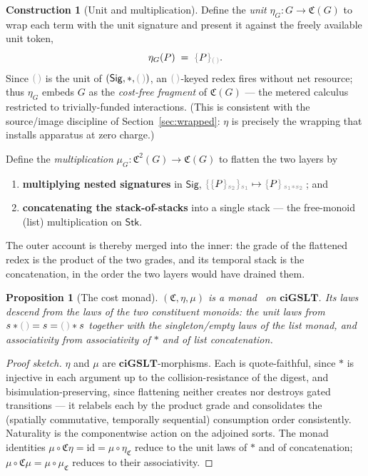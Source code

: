 \documentclass[11pt]{article}
\theoremstyle{definition}
\newtheorem{construction}[definition]{Construction}
\theoremstyle{plain}
\newtheorem{proposition}[definition]{Proposition}
\newcommand{\ciGSLT}{\mathbf{ciGSLT}}
\newcommand{\id}{\mathrm{id}}
\newcommand{\dec}[1]{\textcolor{costgray}{#1}}   %
\newcommand{\Sig}{\mathsf{Sig}}
\newcommand{\Tok}{\mathsf{Stk}}
\newcommand{\Cost}{\mathfrak{C}}              %
\newcommand{\sgn}[2]{\dec{\{}{#1}\dec{\}_{#2}}}  %
\newcommand{\nil}{\dec{(\,)}}                  %
\begin{document}
\begin{construction}[Unit and multiplication]
\label{con:monad}
Define the \emph{unit} $\eta_G : G \to \Cost(G)$ to wrap each term with
the unit signature and present it against the freely available unit
token,
\[
  \eta_G(P) \;=\; \sgn{P}{\nil}.
\]
Since $\nil$ is the unit of $(\Sig,*,\nil)$, an $\nil$-keyed redex fires
without net resource; thus $\eta_G$ embeds $G$ as the \emph{cost-free
fragment} of $\Cost(G)$ --- the metered calculus restricted to
trivially-funded interactions. (This is consistent with the source/image
discipline of Section~\ref{sec:wrapped}: $\eta$ is precisely the wrapping
that installs apparatus at zero charge.)

Define the \emph{multiplication} $\mu_G : \Cost^2(G) \to \Cost(G)$ to
flatten the two layers by
\begin{enumerate}[label=(\roman*),itemsep=1pt]
  \item \textbf{multiplying nested signatures} in $\Sig$,
    $\sgn{\sgn{P}{s_2}}{s_1} \mapsto \sgn{P}{\,s_1 * s_2\,}$; and
  \item \textbf{concatenating the stack-of-stacks} into a single stack ---
    the free-monoid (list) multiplication on $\Tok$.
\end{enumerate}
The outer account is thereby merged into the inner: the grade of the
flattened redex is the product of the two grades, and its temporal stack
is the concatenation, in the order the two layers would have drained them.
\end{construction}

\begin{proposition}[The cost monad]
\label{prop:monad}
$(\Cost, \eta, \mu)$ is a monad~\cite{MacLane1998} on $\ciGSLT$. Its laws descend from the
laws of the two constituent monoids: the unit laws from
$s * \nil = s = \nil * s$ together with the singleton/empty laws of the
list monad, and associativity from associativity of $*$ and of list
concatenation.
\end{proposition}

\begin{proof}[Proof sketch]
$\eta$ and $\mu$ are $\ciGSLT$-morphisms. Each is quote-faithful, since
$*$ is injective in each argument up to the collision-resistance of the
digest, and bisimulation-preserving, since flattening neither creates nor
destroys gated transitions --- it relabels each by the product grade and
consolidates the (spatially commutative, temporally sequential)
consumption order consistently. Naturality is the componentwise action on
the adjoined sorts. The monad identities
$\mu \circ \Cost\eta = \id = \mu \circ \eta_{\Cost}$ reduce to the unit
laws of $*$ and of concatenation; $\mu \circ \Cost\mu = \mu \circ
\mu_{\Cost}$ reduces to their associativity.
\end{proof}
\end{document}

